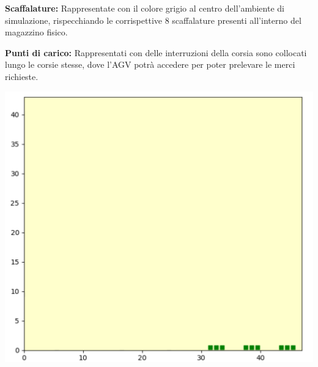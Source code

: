 \documentclass[12pt]{article}
\begin{document}
\begin{minipage}[ht]{0.45\linewidth}
\vspace{0.2cm}
\textbf{Scaffalature:} Rappresentate con il colore grigio al centro dell'ambiente di simulazione, rispecchiando le corrispettive 8 scaffalature presenti all'interno del magazzino fisico.
\end{minipage}
\hspace{0.5cm}
\begin{minipage}[ht]{0.45\linewidth}
\vspace{0.2cm}
\textbf{Punti di carico:} Rappresentati con delle interruzioni della corsia sono collocati lungo le corsie stesse, dove l'AGV potrà accedere per poter prelevare le merci richieste.
\end{minipage}

\vspace{1cm}
\begin{minipage}[ht]{0.45\linewidth}
\centering
\includegraphics[width=\textwidth]{Figures/Map/Gates.png}
\end{minipage}
\hspace{0.5cm}
\end{document}
